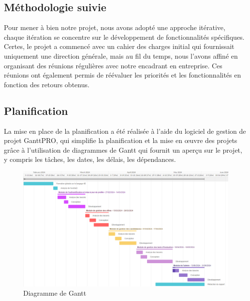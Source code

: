\subsection{Méthodologie suivie}
Pour mener à bien notre projet, nous avons adopté une approche itérative, chaque itération se concentre sur le développement de 
fonctionnalités spécifiques. Certes, le projet a commencé avec un cahier des charges initial qui fournissait uniquement une direction 
générale, mais au fil du temps, nous l'avons affiné en organisant des réunions régulières avec notre encadrant en entreprise. Ces réunions 
ont également permis de réévaluer les priorités et les fonctionnalités en fonction des retours obtenus.

\subsection{Planification}
La mise en place de la planification a été réalisée à l’aide du logiciel de gestion de
projet GanttPRO, qui simplifie la planification et la mise en œuvre des projets grâce à
l’utilisation de diagrammes de Gantt qui fournit un aperçu sur le projet, y compris les
tâches, les dates, les délais, les dépendances.

\begin{figure}[h]
    \centering
    \includegraphics[scale=0.6]{diag/Gantt.png} %
    \caption{Diagramme de Gantt}
    \label{fig:gantt}
\end{figure}

